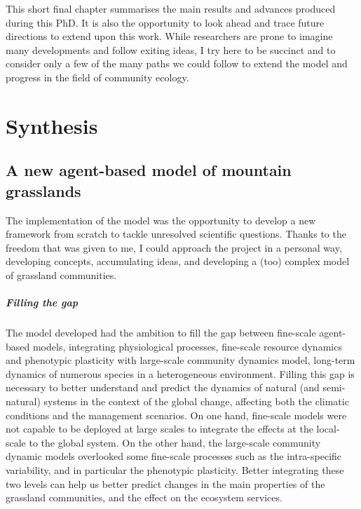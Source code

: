 
\begin{fullwidth}
This short final chapter summarises the main results and advances produced during this PhD. It is also the opportunity to look ahead and trace future directions to extend upon this work. While researchers are prone to imagine many developments and follow exiting ideas, I try here to be succinct and to consider only a few of the many paths we could follow to extend the model and progress in the field of community ecology.
\end{fullwidth}

\chapter{Synthesis}
%
%
%
\section{A new agent-based model of mountain grasslands}

The implementation of the model \model was the opportunity to develop a new framework from scratch to tackle unresolved scientific questions. Thanks to the freedom that was given to me, I could approach the project in a personal way, developing concepts, accumulating ideas, and developing a (too) complex model of grassland communities.

\paragraph{Filling the gap}

The model developed had the ambition to fill the gap between fine-scale agent-based models, integrating physiological processes, fine-scale resource dynamics and phenotypic plasticity with large-scale community dynamics model, long-term dynamics of numerous species in a heterogeneous environment. Filling this gap is necessary to better understand and predict the dynamics of natural (and semi-natural) systems in the context of the global change, affecting both the climatic conditions and the management scenarios. On one hand, fine-scale models were not capable to be deployed at large scales to integrate the effects at the local-scale to the global system. On the other hand, the large-scale community dynamic models overlooked some fine-scale processes such as the intra-specific variability, and in particular the phenotypic plasticity. Better integrating these two levels can help us better predict changes in the main properties of the grassland communities, and the effect on the ecosystem services.

